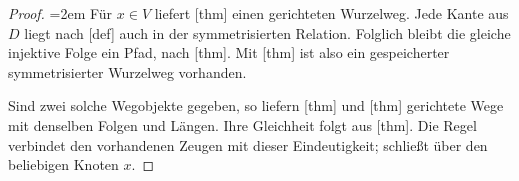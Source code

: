 \begin{proof}
\emergencystretch=2em
Für \(x\in V\) liefert
[thm] einen gerichteten
Wurzelweg. Jede Kante aus \(D\) liegt nach
[def] auch in der
symmetrisierten Relation. Folglich bleibt die gleiche injektive Folge
ein Pfad, nach [thm].
Mit [thm] ist also
ein gespeicherter symmetrisierter Wurzelweg vorhanden.

Sind zwei solche Wegobjekte gegeben, so liefern
[thm] und
[thm] gerichtete Wege
mit denselben Folgen und Längen. Ihre Gleichheit folgt aus
[thm]. Die Regel
\UEI{} verbindet den vorhandenen Zeugen mit dieser Eindeutigkeit;
\rUI{} schließt über den beliebigen Knoten \(x\).
\end{proof}
